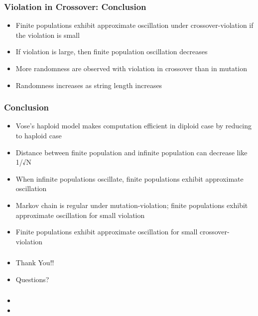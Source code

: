 \documentclass[aspectratio=169]{beamer}
\begin{document}
  \begin{frame}
    \frametitle{Violation in Crossover: Conclusion}
    \begin{itemize}
      \item{Finite populations exhibit approximate oscillation under crossover-violation if the violation is small} 
      \item{If violation is large, then finite population oscillation decreases}      
      \item{More randomness are observed with violation in crossover than in mutation}
      \item{Randomness increases as string length increases}
    \end{itemize}
  \end{frame}
  
  \begin{frame}
    \frametitle{Conclusion}
    \begin{itemize}
      \item{Vose's haploid model makes computation efficient in diploid case by reducing to haploid case} 
      \item{Distance between finite population and infinite population can decrease like 1/√N}
      \item{When infinite populations oscillate, finite populations exhibit approximate oscillation}
      \item{Markov chain is regular under mutation-violation; finite populations exhibit approximate oscillation for small violation}
      \item{Finite populations exhibit approximate oscillation for small crossover-violation}      
    \end{itemize}
  \end{frame}
  
  \begin{frame}
    \frametitle{}
    \begin{itemize}
      \item{Thank You!!} 
      \item{Questions?}
    \end{itemize}
  \end{frame}
  
  \begin{frame}
    \frametitle{}
    \begin{itemize}
      \item{} 
      \item{}
    \end{itemize}
  \end{frame}
  
\end{document}
